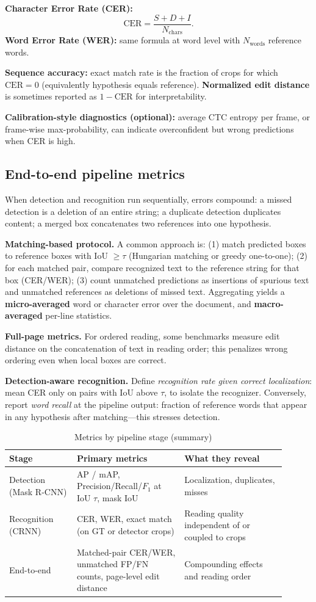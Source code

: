 \documentclass[11pt, a4paper]{article}
\begin{document}
\textbf{Character Error Rate (CER):}
\[
\mathrm{CER} = \frac{S + D + I}{N_{\text{chars}}}.
\]
\textbf{Word Error Rate (WER):} same formula at word level with $N_{\text{words}}$ reference words.

\textbf{Sequence accuracy:} exact match rate is the fraction of crops for which $\mathrm{CER}=0$ (equivalently hypothesis equals reference). \textbf{Normalized edit distance} is sometimes reported as $1-\mathrm{CER}$ for interpretability.

\textbf{Calibration-style diagnostics (optional):} average CTC entropy per frame, or frame-wise max-probability, can indicate overconfident but wrong predictions when CER is high.

\subsection{End-to-end pipeline metrics}
When detection and recognition run sequentially, errors compound: a missed detection is a deletion of an entire string; a duplicate detection duplicates content; a merged box concatenates two references into one hypothesis.

\textbf{Matching-based protocol.} A common approach is: (1) match predicted boxes to reference boxes with IoU $\geq \tau$ (Hungarian matching or greedy one-to-one); (2) for each matched pair, compare recognized text to the reference string for that box (CER/WER); (3) count unmatched predictions as insertions of spurious text and unmatched references as deletions of missed text. Aggregating yields a \textbf{micro-averaged} word or character error over the document, and \textbf{macro-averaged} per-line statistics.

\textbf{Full-page metrics.} For ordered reading, some benchmarks measure edit distance on the concatenation of text in reading order; this penalizes wrong ordering even when local boxes are correct.

\textbf{Detection-aware recognition.} Define \emph{recognition rate given correct localization}: mean CER only on pairs with IoU above $\tau$, to isolate the recognizer. Conversely, report \emph{word recall} at the pipeline output: fraction of reference words that appear in any hypothesis after matching---this stresses detection.

\begin{table}[h]
\centering
\caption{Metrics by pipeline stage (summary)}
\begin{tabular}{@{}p{0.22\linewidth}p{0.35\linewidth}p{0.33\linewidth}@{}}
\toprule
Stage & Primary metrics & What they reveal \\
\midrule
Detection (Mask R-CNN) & AP / mAP, Precision/Recall/$F_1$ at IoU $\tau$, mask IoU & Localization, duplicates, misses \\
Recognition (CRNN) & CER, WER, exact match (on GT or detector crops) & Reading quality independent of or coupled to crops \\
End-to-end & Matched-pair CER/WER, unmatched FP/FN counts, page-level edit distance & Compounding effects and reading order \\
\bottomrule
\end{tabular}
\end{table}
\end{document}
